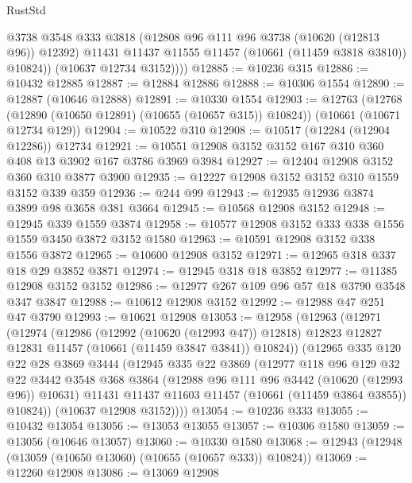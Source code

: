 \begin{lexlean}{RustStd}
\begin{coremodule}
              @3738
              @3548
              @333
              @3818
              (@12808 @96 @111 @96 @3738 (@10620 (@12813 @96)) @12392)
              @11431
              @11437
              @11555
              @11457
              (@10661 (@11459 @3818 @3810))
              @10824))
          (@10637 @12734 @3152))))
@12885 := @10236 @315
@12886 := @10432 @12885
@12887 := @12884 @12886
@12888 := @10306 @1554
@12890 := @12887 (@10646 @12888)
@12891 := @10330 @1554
@12903 := @12763
    (@12768 (@12890 (@10650 @12891) (@10655 (@10657 @315)) @10824))
    (@10661 (@10671 @12734 @129))
@12904 := @10522 @310
@12908 := @10517 (@12284 (@12904 @12286)) @12734
@12921 := @10551 @12908 @3152 @3152 @167 @310 @360 @408 @13 @3902 @167 @3786 @3969 @3984
@12927 := @12404 @12908 @3152 @360 @310 @3877 @3900
@12935 := @12227 @12908 @3152 @3152 @310 @1559 @3152 @339 @359
@12936 := @244 @99
@12943 := @12935 @12936 @3874 @3899 @98 @3658 @381 @3664
@12945 := @10568 @12908 @3152
@12948 := @12945 @339 @1559 @3874
@12958 := @10577 @12908 @3152 @333 @338 @1556 @1559 @3450 @3872 @3152 @1580
@12963 := @10591 @12908 @3152 @338 @1556 @3872
@12965 := @10600 @12908 @3152
@12971 := @12965 @318 @337 @18 @29 @3852 @3871
@12974 := @12945 @318 @18 @3852
@12977 := @11385 @12908 @3152 @3152
@12986 := @12977 @267 @109 @96 @57 @18 @3790 @3548 @347 @3847
@12988 := @10612 @12908 @3152
@12992 := @12988 @47 @251 @47 @3790
@12993 := @10621 @12908
@13053 := @12958
    (@12963
      (@12971
        (@12974
          (@12986
            (@12992 (@10620 (@12993 @47)) @12818)
            @12823
            @12827
            @12831
            @11457
            (@10661 (@11459 @3847 @3841))
            @10824))
        (@12965
          @335
          @120
          @22
          @28
          @3869
          @3444
          (@12945
            @335
            @22
            @3869
            (@12977
              @118
              @96
              @129
              @32
              @22
              @3442
              @3548
              @368
              @3864
              (@12988 @96 @111 @96 @3442 (@10620 (@12993 @96)) @10631)
              @11431
              @11437
              @11603
              @11457
              (@10661 (@11459 @3864 @3855))
              @10824))
          (@10637 @12908 @3152))))
@13054 := @10236 @333
@13055 := @10432 @13054
@13056 := @13053 @13055
@13057 := @10306 @1580
@13059 := @13056 (@10646 @13057)
@13060 := @10330 @1580
@13068 := @12943 (@12948 (@13059 (@10650 @13060) (@10655 (@10657 @333)) @10824))
@13069 := @12260 @12908
@13086 := @13069
    @12908

\end{coremodule}
\end{lexlean}

